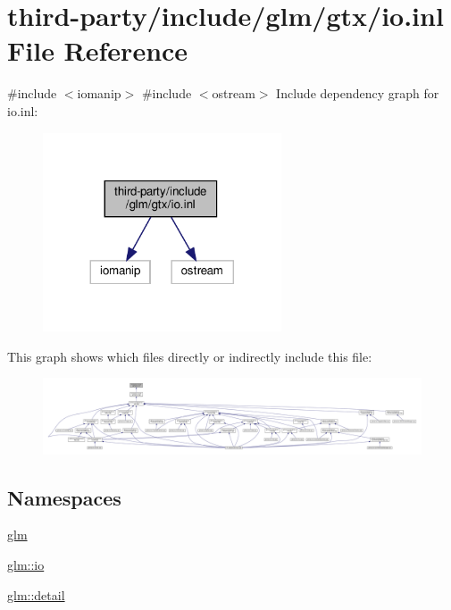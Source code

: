 \hypertarget{io_8inl}{}\section{third-\/party/include/glm/gtx/io.inl File Reference}
\label{io_8inl}
{\ttfamily \#include $<$iomanip$>$}\newline
{\ttfamily \#include $<$ostream$>$}\newline
Include dependency graph for io.\+inl\+:
\nopagebreak
\begin{figure}[H]
\begin{center}
\leavevmode
\includegraphics[width=200pt]{io_8inl__incl}
\end{center}
\end{figure}
This graph shows which files directly or indirectly include this file\+:
\nopagebreak
\begin{figure}[H]
\begin{center}
\leavevmode
\includegraphics[width=350pt]{io_8inl__dep__incl}
\end{center}
\end{figure}
\subsection*{Namespaces}
\begin{DoxyCompactItemize}
\item 
 \hyperlink{namespaceglm}{glm}
\item 
 \hyperlink{namespaceglm_1_1io}{glm\+::io}
\item 
 \hyperlink{namespaceglm_1_1detail}{glm\+::detail}
\end{DoxyCompactItemize}
